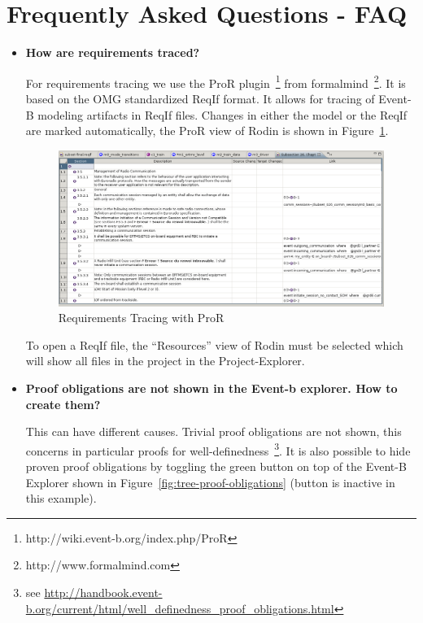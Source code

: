 \documentclass[10pt,a4paper]{article}
\begin{document}
\section{Frequently Asked Questions - FAQ}
\label{sec:faq}

\begin{itemize}
\item {\bf How are requirements traced?}

  For requirements tracing we use the ProR
  plugin~\footnote{http://wiki.event-b.org/index.php/ProR} from
  formalmind~\footnote{http://www.formalmind.com}. It is based on the OMG
  standardized ReqIf format. It allows for tracing of Event-B modeling artifacts
  in ReqIf files. Changes in either the model or the ReqIf are marked
  automatically, the ProR view of Rodin is shown in
  Figure~\ref{fig:req-tracing}.


  \begin{figure}[H]
    \centering
    \includegraphics[width=\textwidth]{ReqIfinRodin}
    \caption{Requirements Tracing with ProR}
    \label{fig:req-tracing}
  \end{figure}

  To open a ReqIf file, the ``Resources'' view of Rodin must be selected which
  will show all files in the project in the Project-Explorer.

\item {\bf Proof obligations are not shown in the Event-b explorer. How to
    create them?}

  This can have different causes. Trivial proof obligations are not shown, this
  concerns in particular proofs for well-definedness~\footnote{see
    \url{http://handbook.event-b.org/current/html/well_definedness_proof_obligations.html}}. It
  is also possible to hide proven proof obligations by toggling the green button
  on top of the Event-B Explorer shown in
  Figure~\ref{fig:tree-proof-obligations} (button is inactive in this example).


\end{itemize}
\end{document}
